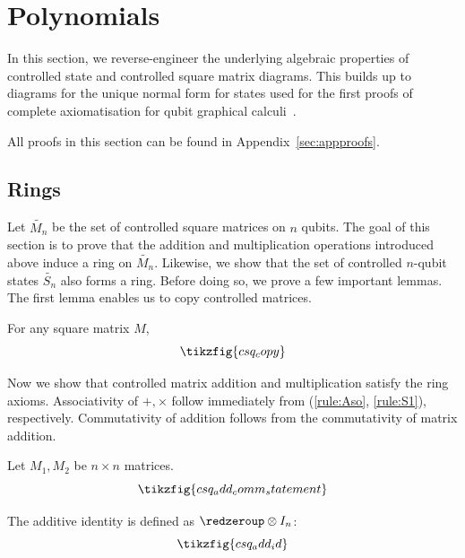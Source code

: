 \section{Polynomials}
In this section, we reverse-engineer the underlying algebraic properties of controlled state and controlled square matrix diagrams. This builds up to diagrams for the unique normal form for states used for the first proofs of complete axiomatisation for qubit graphical calculi~\cite{hadzihasanovic2017thesis, Hadzihasanovic2018zwzxcomplete}.

All proofs in this section can be found in Appendix~\ref{sec:appproofs}.

\subsection{Rings}\label{sec:ring}
Let $\tilde{M_n}$ be the set of controlled square matrices on $n$ qubits. The goal of this section is to prove that the addition and multiplication operations introduced above induce a ring on $\tilde{M_n}$. Likewise, we show that the set of controlled $n$-qubit states $\tilde{S_n}$ also forms a ring. Before doing so, we prove a few important lemmas. The first lemma enables us to copy controlled matrices.

\begin{lemma}\label{lem:csq_copy}
    For any square matrix $M$, 
    \begin{equation}\label{rule:CMcpy}
    \tikzfig{csq_copy}
\end{equation}
\end{lemma}

Now we show that controlled matrix addition and multiplication satisfy the ring axioms. Associativity of $+, \times$ follow immediately from (\ref{rule:Aso}, \ref{rule:S1}), respectively. Commutativity of addition follows from the commutativity of matrix addition.

\begin{lemma}\label{lem:csqaddcomm}
    Let $M_1, M_2$ be $n \times n$ matrices. 
    \begin{equation}\label{rule:CMcom}
        \tikzfig{csq_add_comm_statement}
    \end{equation}
\end{lemma}


The additive identity is defined as $\redzeroup \otimes I_n$:
\begin{equation}
    \tikzfig{csq_add_id}
\end{equation}


